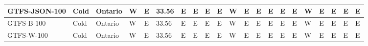\begin{table}[]
{\begin{tabular}{|l|l|l|l|l|l|l|l|l|l|l|l|l|l|l|l|l|l|l|l|l|}
GTFS-JSON-100                                           & Cold                   & Ontario        & W           & E           & 33.56       & E           & E           & E           & E           & W           & E           & E            & E            & E            & E            & W            & E            & E            & E            & E            \\ \hline
GTFS-B-100                                              & Cold                   & Ontario        & W           & E           & 33.56       & E           & E           & E           & E           & W           & E           & E            & E            & E            & E            & W            & E            & E            & E            & E            \\ \hline
GTFS-W-100                                              & Cold                   & Ontario        & W           & E           & 33.56       & E           & E           & E           & E           & W           & E           & E            & E            & E            & E            & W            & E            & E            & E            & E            \\ \hline
\end{tabular}%
}
\end{table}

